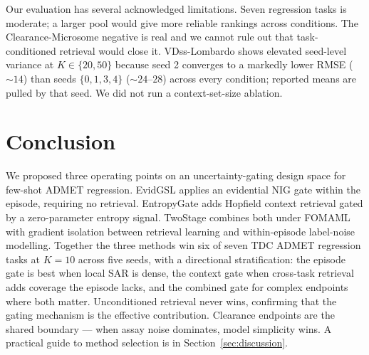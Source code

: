 \documentclass{article}
\theoremstyle{plain}
\theoremstyle{definition}
\theoremstyle{remark}
\begin{document}
Our evaluation has several acknowledged limitations. Seven regression tasks is moderate; a larger pool would give more reliable rankings across conditions. The Clearance-Microsome negative is real and we cannot rule out that task-conditioned retrieval would close it. VDss-Lombardo shows elevated seed-level variance at $K{\in}\{20,50\}$ because seed 2 converges to a markedly lower RMSE ($\sim14$) than seeds $\{0,1,3,4\}$ ($\sim24$--$28$) across every condition; reported means are pulled by that seed. We did not run a context-set-size ablation.


\section{Conclusion}
\label{sec:conclusion}

We proposed three operating points on an uncertainty-gating design space for few-shot ADMET regression. EvidGSL applies an evidential NIG gate within the episode, requiring no retrieval. EntropyGate adds Hopfield context retrieval gated by a zero-parameter entropy signal. TwoStage combines both under FOMAML with gradient isolation between retrieval learning and within-episode label-noise modelling. Together the three methods win six of seven TDC ADMET regression tasks at $K\!=\!10$ across five seeds, with a directional stratification: the episode gate is best when local SAR is dense, the context gate when cross-task retrieval adds coverage the episode lacks, and the combined gate for complex endpoints where both matter. Unconditioned retrieval never wins, confirming that the gating mechanism is the effective contribution. Clearance endpoints are the shared boundary — when assay noise dominates, model simplicity wins. A practical guide to method selection is in Section~\ref{sec:discussion}.



\end{document}
